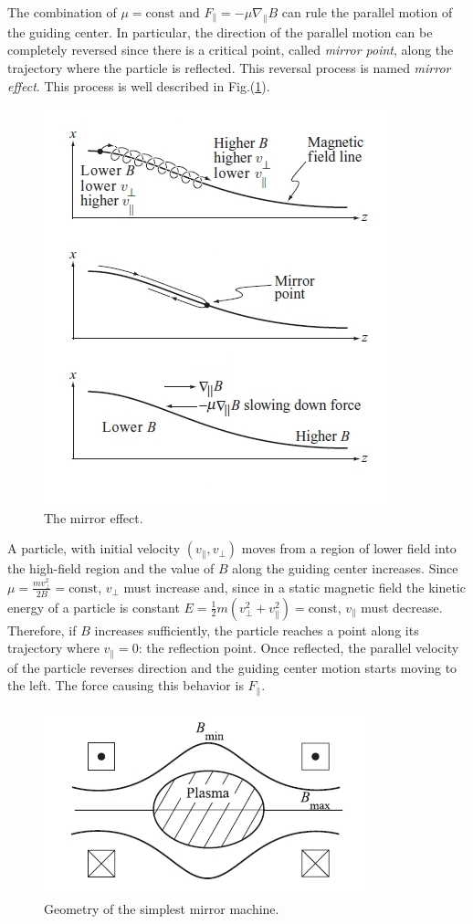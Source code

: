 The combination of $\mu=\mathrm{const}$ and $F_{\|}=−\mu\nabla_{\|} B$ can rule the parallel motion of the guiding center. In particular, the direction of the parallel motion can be completely reversed since there is a critical point, called \textit{mirror point}, along the trajectory where the particle is reflected. This reversal process is named \textit{mirror effect}. This process is well described in Fig.(\ref{fig:mirroring}).

\begin{figure}
\centering
\includegraphics[scale=.6]{images/mirroring.jpg}
\caption{The mirror effect.}
\label{fig:mirroring}
\end{figure}

A particle, with initial velocity $(v_{\|},v_{\perp})$ moves from a region of lower field into the high-field region and the value of $B$ along the guiding center increases. Since $\mu=\frac{mv^2_{\perp}}{2B}=\mathrm{const}$, $v_{\perp}$ must increase and, since in a static magnetic field the kinetic energy of a particle is constant $E=\frac{1}{2}m(v_{\perp}^2+v_{\|}^2)=\mathrm{const}$, $v_{\|}$ must decrease. Therefore, if $B$ increases sufficiently, the particle reaches a point along its trajectory where $v_{\|}=0$: the reflection point. Once reflected, the parallel velocity of the particle reverses direction and the guiding center motion starts moving to the left. The force causing this behavior is $F_{\|}$.

\begin{figure}
\centering
\includegraphics[scale=.6]{images/mirror_machine.jpg}
\caption{Geometry of the simplest mirror machine.}
\label{fig:mirror_machine}
\end{figure}

